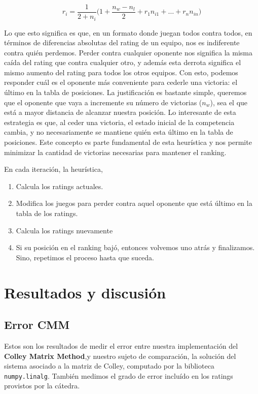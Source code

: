\documentclass[a4paper]{article}
\begin{document}
\[r_i = \frac{1}{2+n_i}\Big(1 + \frac{n_w - n_l}{2} + r_{1}n_{i1} + \ldots + r_{n}n_{in}\Big)\]

Lo que esto significa es que, en un formato donde juegan todos contra todos, en términos de diferencias absolutas del rating de un equipo, nos es indiferente contra quién perdemos. Perder contra cualquier oponente nos significa la misma caída del rating que contra cualquier otro, y además esta derrota significa el mismo aumento del rating para todos los otros equipos. Con esto, podemos responder cuál es el oponente más conveniente para cederle una victoria: el último en la tabla de posiciones. La justificación es bastante simple, queremos que el oponente que vaya a incremente su número de victorias ($n_w$), sea el que está a mayor distancia de alcanzar nuestra posición. Lo interesante de esta estrategia es que, al ceder una victoria, el estado inicial de la competencia cambia, y no necesariamente se mantiene quién esta último en la tabla de posiciones. Este concepto es parte fundamental de esta heurística y nos permite minimizar la cantidad de victorias necesarias para mantener el ranking.

En cada iteración, la heurística,
\begin{enumerate}
    \item Calcula los ratings actuales.
    \item Modifica los juegos para perder contra aquel oponente que está último en la tabla de los ratings.
    \item Calcula los ratings nuevamente
    \item Si su posición en el ranking bajó, entonces volvemos uno atrás y finalizamos. Sino, repetimos el proceso hasta que suceda.
\end{enumerate}

\section{Resultados y discusión}

\subsection{Error CMM}

Estos son los resultados de medir el error entre nuestra implementación del \textbf{Colley Matrix Method},y nuestro sujeto de comparación, la solución del sistema asociado a la matriz de Colley, computado por la biblioteca \texttt{numpy.linalg}. También medimos el grado de error incluído en los ratings provistos por la cátedra.
\end{document}
